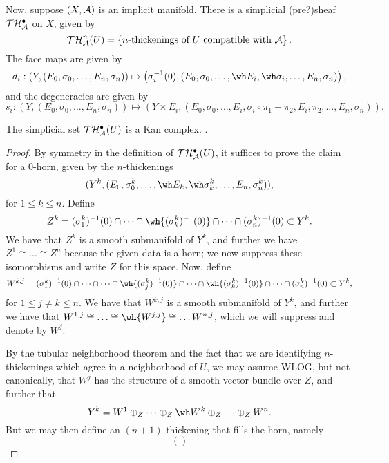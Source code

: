 Now, suppose $(X, \mathcal A)$ is an implicit manifold.  There is a simplicial (pre?)sheaf $\mathcal T \mathcal H_\mathcal A^\bullet$ on $X$, given by
\[ \mathcal T \mathcal H_\mathcal A^n(U) = \left\{ \text{$n$-thickenings of $U$ compatible with $\mathcal A$} \right\}. \]
The face maps are given by
\[ d_i : \left( Y, (E_0, \sigma_0, \dots, E_n, \sigma_n) \right) \mapsto \left( \sigma_i^{-1}(0), (E_0, \sigma_0, \dots, \wh E_i, \wh \sigma_i, \dots , E_n, \sigma_n) \right), \]
and the degeneracies are given by
\[ s_i : \left( Y, (E_0, \sigma_0, \dots, E_n, \sigma_n) \right) \mapsto \left( Y \times E_i, (E_0, \sigma_0, \dots, E_i, \sigma_i \circ \pi_1 - \pi_2, E_i, \pi_2, \dots, E_n, \sigma_n) \right). \]

\begin{prop}\label{thickenings-are-kan-complexes}
The simplicial set $\mathcal T \mathcal H_\mathcal A^\bullet(U)$ is a Kan complex. .
\end{prop}

\begin{proof}
By symmetry in the definition of $\mathcal T \mathcal H_\mathcal A^\bullet(U)$, it suffices to prove the claim for a $0$-horn, given by the $n$-thickenings
\[ (Y^k, (E_0, \sigma_0^k, \dots, \wh E_k, \wh \sigma_k^k, \dots, E_n, \sigma_n^k)), \]
for $1 \leq k \leq n$. Define
\[ Z^k = (\sigma_1^k)^{-1}(0) \cap \dots \cap \wh {(\sigma_k^k)^{-1}(0)} \cap \dots \cap (\sigma_n^k)^{-1}(0) \subset Y^k. \]
We have that $Z^k$ is a smooth submanifold of $Y^k$, and further we have $Z^1 \cong \dots \cong Z^n$ because the given data is a horn; we now suppress these isomorphisms and write $Z$ for this space. Now, define
\[ W^{k, j} = (\sigma_1^k)^{-1}(0) \cap \dots \cap \dots \cap \wh {(\sigma_j^k)^{-1}(0)} \cap \dots \cap \wh {(\sigma_k^k)^{-1}(0)} \cap \dots \cap (\sigma_n^k)^{-1}(0) \subset Y^k, \]
for $1 \leq j \neq k \leq n$. We have that $W^{k, j}$ is a smooth submanifold of $Y^k$, and further we have that $W^{1, j} \cong \dots \cong \wh {W^{j, j}} \cong \dots W^{n, j}$, which we will suppress and denote by $W^j$.

By the tubular neighborhood theorem and the fact that we are identifying $n$-thickenings which agree in a neighborhood of $U$, we may assume WLOG, but not canonically, that $W^j$ has the structure of a smooth vector bundle over $Z$, and further that
\[ Y^k = W^1 \oplus_Z \dots \oplus_Z \wh W^k \oplus_Z \dots \oplus_Z W^n. \]
But we may then define an $(n + 1)$-thickening that fills the horn, namely
\[ \left(  \right) \]
\end{proof}

